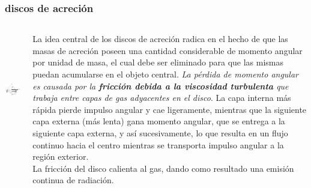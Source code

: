 \documentclass{beamer}
\begin{document}
\begin{frame}
\frametitle{discos de acreción}
\begin{columns}
\begin{column}{0.5\textwidth}
\hspace*{-1cm} \includegraphics[width=6.5cm,height=5cm]{modelo.png}
\end{column}
\begin{column}{0.5\textwidth}
\justify
\scriptsize
La idea central de los discos de acreción radica en el hecho de que 
las masas de acreción poseen una cantidad considerable de momento
angular por unidad de masa, el cual debe ser eliminado para que las
mismas puedan acumularse en el objeto central. \textit{\textcolor{lilaoscuro} {La pérdida de momento
angular es causada por la \textbf{fricción debida a la viscosidad turbulenta}
que trabaja entre capas de gas adyacentes en el disco}}. La capa interna 
más rápida pierde impulso angular y cae ligeramente, mientras que la
siguiente capa externa (más lenta) gana momento angular, que se entrega
a la siguiente capa externa, y así sucesivamente, lo que resulta en un
flujo continuo hacia el centro mientras se transporta impulso angular
a la región exterior.\\
La fricción del disco calienta al gas, dando
como resultado una emisión continua de radiación.
\end{column}
\end{columns}
\end{frame}
\end{document}
